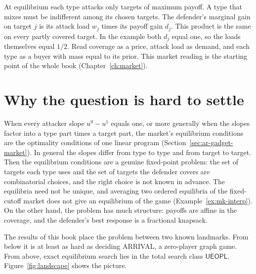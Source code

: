 At equilibrium each type attacks only targets of maximum payoff. A type
that mixes must be indifferent among its chosen targets. The defender's
marginal gain on target $j$ is its attack load $w_j$ times its payoff
gain $d_j$. This product is the same on every partly covered target.
In the example both $d_j$ equal one, so the loads themselves equal $1/2$.
Read coverage as a price, attack load as demand, and each type as a buyer
with mass equal to its prior. This market reading is the
starting point of the whole book (Chapter~\ref{ch:market}).

\section{Why the question is hard to settle}

When every attacker slope $u^0-u^1$ equals one, or more generally when the slopes factor into a type
part times a target part, the market's equilibrium conditions are the optimality conditions of one
linear program (Section~\ref{sec:ar-gadget-market}). In general the slopes differ from type to type
and from target to target. Then the equilibrium conditions are a
genuine fixed-point problem: the set of targets each type uses and the set of targets the defender
covers are combinatorial choices, and the right choice is not known in advance. The equilibria need not
be unique, and averaging two ordered equilibria of the fixed-cutoff market does not give an
equilibrium of the game (Example~\ref{ex:mk-interp}). On the other hand, the problem has much structure: payoffs are affine in
the coverage, and the defender's best response is a fractional knapsack.

The results of this book place the problem between two known landmarks. From below it is at least as
hard as deciding ARRIVAL, a zero-player graph game. From above, exact
equilibrium search lies in the total search class $\mathsf{UEOPL}$.
Figure~\ref{fig:landscape} shows the picture.

